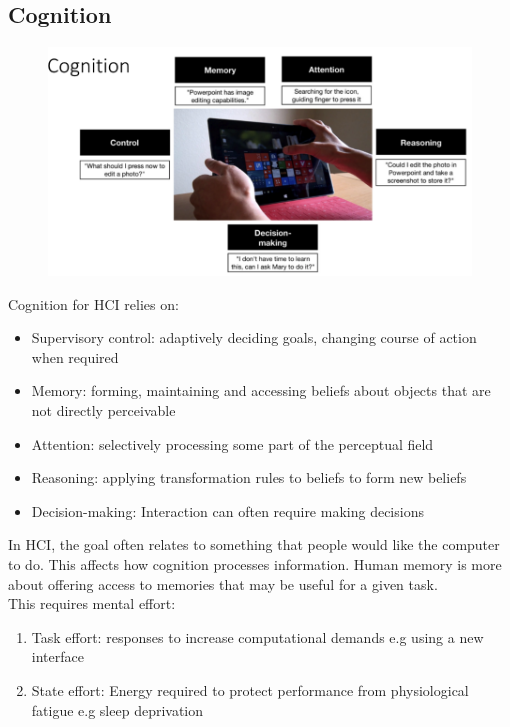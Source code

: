\documentclass{article}
\begin{document}
\subsection{Cognition}
\begin{figure}[H]
    \centering
    \includegraphics[width=0.7\linewidth]{Pictures/Screenshot 2023-02-22 at 18.30.45.png}
\end{figure}
Cognition for HCI relies on:
\begin{itemize}
    \item Supervisory control: adaptively deciding goals, changing course of action when required
    \item Memory: forming, maintaining and accessing beliefs about objects that are not directly perceivable
    \item Attention: selectively processing some part of the perceptual field
    \item Reasoning: applying transformation rules to beliefs to form new beliefs
    \item Decision-making: Interaction can often require making decisions
\end{itemize}
In HCI, the goal often relates to something that people would like the computer to do. This affects how cognition processes information. Human memory is more about offering access to memories that may be useful for a given task. \\
This requires mental effort:
\begin{enumerate}
    \item Task effort: responses to increase computational demands e.g using a new interface
    \item State effort: Energy required to protect performance from physiological fatigue e.g sleep deprivation
\end{enumerate}
\end{document}

